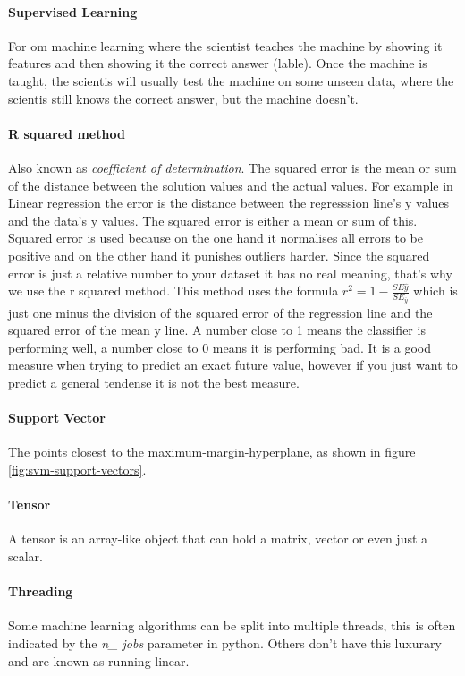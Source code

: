 \paragraph{Supervised Learning} 
For om machine learning where the scientist teaches the machine by showing it features and then showing it the correct answer (lable). Once the machine is taught, the scientis will usually test the machine on some unseen data, where the scientis still knows the correct answer, but the machine doesn't.

\paragraph{R squared method}
Also known as \emph{coefficient of determination}. The squared error is the mean or sum of the distance between the solution values and the actual values. For example in Linear regression the error is the distance between the regresssion line's y values and the data's y values. The squared error is either a mean or sum of this. Squared error is used because on the one hand it normalises all errors to be positive and on the other hand it punishes outliers harder. Since the squared error is just a relative number to your dataset it has no real meaning, that's why we use the r squared method. This method uses the formula $r^2 = 1 - \frac{SE\hat{y}}{SE_{\overline{y}}}$ which is just one minus the division of the squared error of the regression line and the squared error of the mean y line. A number close to 1 means the classifier is performing well, a number close to 0 means it is performing bad. It is a good measure when trying to predict an exact future value, however if you just want to predict a general tendense it is not the best measure.

\paragraph{Support Vector}
The points closest to the maximum-margin-hyperplane, as shown in figure \ref{fig:svm-support-vectors}.

\paragraph{Tensor} 
A tensor is an array-like object that can hold a matrix, vector or even just a scalar.

\paragraph{Threading} 
Some machine learning algorithms can be split into multiple threads, this is often indicated by the \emph{n\_ jobs} parameter in python. Others don't have this luxurary and are known as running linear.

